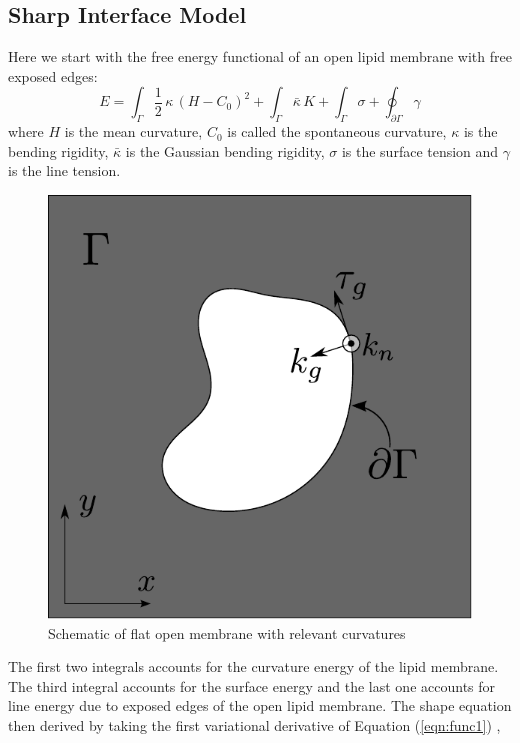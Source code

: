 \documentclass[english,12pt]{article}
\begin{document}
\subsection{Sharp Interface Model}
Here we start with the free energy functional of an open lipid membrane with free exposed edges: \cite{PhysRevE.68.061915, PhysRevE.66.021607} 
\begin{equation}
E = \int_{\Gamma}\frac{1}{2}\,\kappa\,\left(H-C_{0}\right)^{2}+\int_{\Gamma}\bar{\kappa}\,K+\int_{\Gamma}\sigma+\oint_{\partial\Gamma}\gamma
\label{eqn:func1}
\end{equation}
where $H$ is the mean curvature, $C_0$ is called the spontaneous curvature, $\kappa$ is the bending rigidity, $\bar{\kappa}$ is the Gaussian bending rigidity, $\sigma$ is the surface tension and $\gamma$ is the line tension.
\begin{figure}[H]
	\centering
	\includegraphics[scale=0.55]{pics/model1.pdf}
	\caption{Schematic of flat open membrane with relevant curvatures}
	\label{fig:model1}
\end{figure}
The first two integrals accounts for the curvature energy of the lipid membrane. The third integral accounts for the surface energy and the last one accounts for line energy due to exposed edges of the open lipid membrane. The shape equation then derived by taking the first variational derivative of Equation (\ref{eqn:func1}) \cite{PhysRevE.68.061915},
\end{document}
